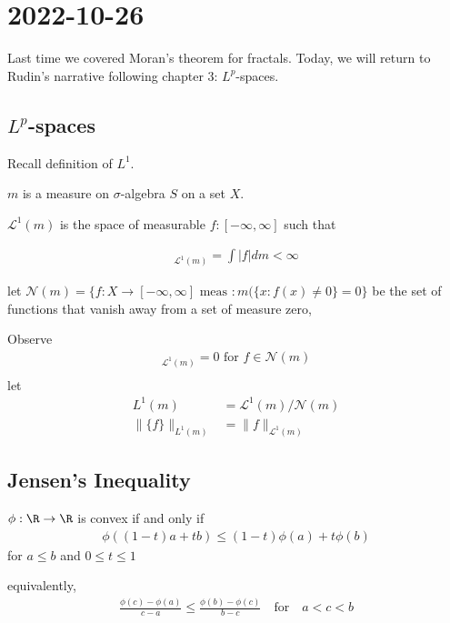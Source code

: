 \section{2022-10-26}

Last time we covered Moran's theorem for fractals. 
Today, we will return to Rudin's narrative following chapter 3: $L^{p}$-spaces.

\subsection{\texorpdfstring{$L^{p}$-spaces}{Lp-spaces}}

Recall definition of $L^{1}$.

$m$ is a measure on $\sigma$-algebra $S$ on a set $X$.

$\mathcal{L}^{1}(m)$ is the space of measurable $f : [-\infty, \infty]$ such that

\begin{align*}
	[f]_{\mathcal{L}^{1}(m)} = \int |f| dm < \infty
\end{align*}

let $\mathcal{N}(m) = \{f : X \to [-\infty, \infty] \text{ meas }: m(\{x : f(x) \neq 0\} = 0\}$ be the set of functions that vanish away from a set of measure zero,

Observe
\begin{align*}
	[f]_{\mathcal{L}^1 (m) } = 0 \text{ for } f \in \mathcal{N}(m) \\
\end{align*} let
 \begin{align*}
	 L^{1} (m) &= \mathcal{L}^1 (m) / \mathcal{N} (m) \\
	 \|\{f\}\|_{L^1 (m) } &= \|f\|_{\mathcal{L}^1 (m) }
\end{align*}


\subsection{ Jensen's Inequality }

\begin{definition}[Convex]
	$\phi : \R \to \R$ is convex if and only if
	\begin{align*}
		\phi (( 1 - t) a + tb) \leq (1-t) \phi (a) + t \phi (b)
	\end{align*} for $a \leq b$ and $0 \leq t \leq 1$

	equivalently,
	\begin{align*}
		\frac{\phi (c) - \phi (a)}{c - a} \leq \frac{\phi (b) - \phi (c)}{b - c}
		\quad \text{for} \quad  a < c < b
	\end{align*}
\end{definition}


